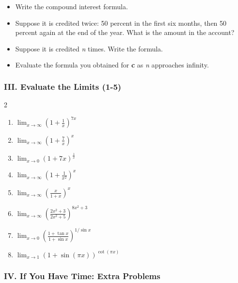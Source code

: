 \documentclass[12pt]{article}
\begin{document}
\begin{itemize}
    \item[\quad \textbf{a.}] Write the compound interest formula.
    \item[\quad \textbf{b.}] Suppose it is credited twice: 50 percent in the first six months, then 50 percent again at the end of the year. What is the amount in the account?
    \item[\quad \textbf{c.}] Suppose it is credited \textit{n} times. Write the formula.
    \item[\quad \textbf{d.}] Evaluate the formula you obtained for \textbf{c} as \textit{n} approaches infinity.
\end{itemize}

\vspace{5mm}
\pagebreak 
\subsubsection*{III. Evaluate the Limits (1-5)}

\begin{multicols}{2}
\begin{enumerate}
    \item $\displaystyle \lim_{x \to \infty} \left(1 + \frac{1}{x}\right)^{7x}$ 
    \item $\displaystyle \lim_{x \to \infty} \left(1 + \frac{7}{x}\right)^{x}$ 
    \item $\displaystyle \lim_{x \to 0} \left(1 + 7x\right)^{\frac{1}{x}}$ 
    \item $\displaystyle \lim_{x \to \infty} \left(1 + \frac{1}{x^2}\right)^x$
    \item $\displaystyle \lim_{x \to \infty} \left(\frac{x}{1+x}\right)^x$ 
    \item $\displaystyle \lim_{x \to \infty} \left(\frac{2x^2+3}{2x^2+5}\right)^{8x^2+3}$
    \item $\displaystyle \lim_{x \to 0} \left(\frac{1+\tan x}{1+ \sin x}\right)^{1/ \sin x}$
    \item $\displaystyle \lim_{x \to 1} \left(1 + \sin(\pi x)\right)^{\cot(\pi x)}$

\end{enumerate}
\end{multicols}

\vspace{5mm}

\subsubsection*{IV. If You Have Time: Extra Problems}
\end{document}
